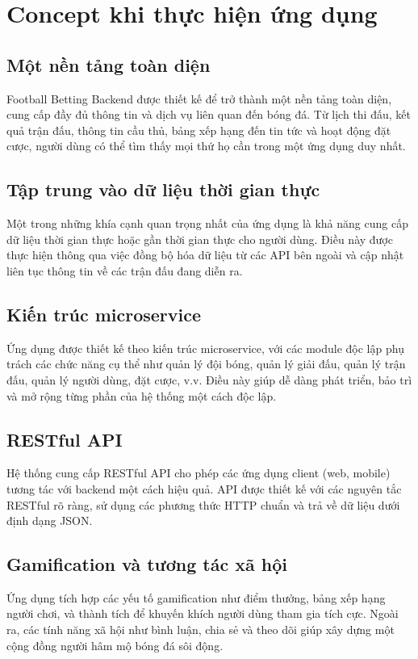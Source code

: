 \documentclass[a4paper,12pt]{report}
\begin{document}
\section{Concept khi thực hiện ứng dụng}

\subsection{Một nền tảng toàn diện}
Football Betting Backend được thiết kế để trở thành một nền tảng toàn diện, cung cấp đầy đủ thông tin và dịch vụ liên quan đến bóng đá. Từ lịch thi đấu, kết quả trận đấu, thông tin cầu thủ, bảng xếp hạng đến tin tức và hoạt động đặt cược, người dùng có thể tìm thấy mọi thứ họ cần trong một ứng dụng duy nhất.

\subsection{Tập trung vào dữ liệu thời gian thực}
Một trong những khía cạnh quan trọng nhất của ứng dụng là khả năng cung cấp dữ liệu thời gian thực hoặc gần thời gian thực cho người dùng. Điều này được thực hiện thông qua việc đồng bộ hóa dữ liệu từ các API bên ngoài và cập nhật liên tục thông tin về các trận đấu đang diễn ra.

\subsection{Kiến trúc microservice}
Ứng dụng được thiết kế theo kiến trúc microservice, với các module độc lập phụ trách các chức năng cụ thể như quản lý đội bóng, quản lý giải đấu, quản lý trận đấu, quản lý người dùng, đặt cược, v.v. Điều này giúp dễ dàng phát triển, bảo trì và mở rộng từng phần của hệ thống một cách độc lập.

\subsection{RESTful API}
Hệ thống cung cấp RESTful API cho phép các ứng dụng client (web, mobile) tương tác với backend một cách hiệu quả. API được thiết kế với các nguyên tắc RESTful rõ ràng, sử dụng các phương thức HTTP chuẩn và trả về dữ liệu dưới định dạng JSON.

\subsection{Gamification và tương tác xã hội}
Ứng dụng tích hợp các yếu tố gamification như điểm thưởng, bảng xếp hạng người chơi, và thành tích để khuyến khích người dùng tham gia tích cực. Ngoài ra, các tính năng xã hội như bình luận, chia sẻ và theo dõi giúp xây dựng một cộng đồng người hâm mộ bóng đá sôi động.
\end{document}
